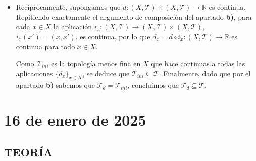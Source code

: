 \begin{enumerate}
\begin{sol}
\begin{enumerate}
\begin{dem}
\begin{itemize}
            \item[($\Longleftarrow$)] Recíprocamente, supongamos que $d : (X, \mathcal{T}) \times (X, \mathcal{T}) \to \mathbb{R}$ es continua. Repitiendo exactamente el argumento de composición del apartado \textbf{b)}, para cada $x \in X$ la aplicación $i_x : (X, \mathcal{T}) \to (X, \mathcal{T}) \times (X, \mathcal{T})$, $i_x(x') = (x, x')$, es continua, por lo que $d_x = d \circ i_x : (X, \mathcal{T}) \to \mathbb{R}$ es continua para todo $x \in X$.
            
            Como $\mathcal{T}_{ini}$ es la topología menos fina en $X$ que hace continuas a todas las aplicaciones $\{d_x\}_{x \in X}$, se deduce que $\mathcal{T}_{ini} \subseteq \mathcal{T}$. Finalmente, dado que por el apartado \textbf{b)} sabemos que $\mathcal{T}_d = \mathcal{T}_{ini}$, concluimos que $\mathcal{T}_d \subseteq \mathcal{T}$.
        \end{itemize}
    \end{dem}
\end{enumerate}
    \end{sol}
\end{enumerate}

\newpage

\section{16 de enero de 2025}

\subsection*{TEOR\'IA}

